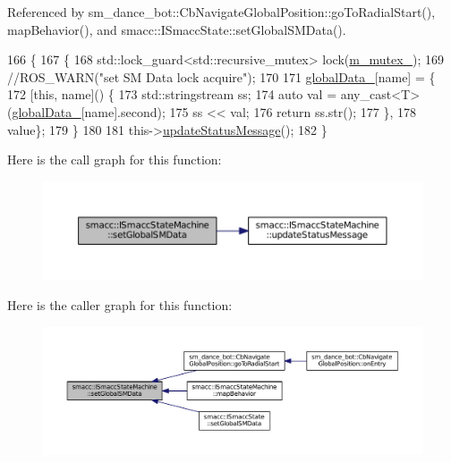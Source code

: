 Referenced by sm\+\_\+dance\+\_\+bot\+::\+Cb\+Navigate\+Global\+Position\+::go\+To\+Radial\+Start(), map\+Behavior(), and smacc\+::\+I\+Smacc\+State\+::set\+Global\+S\+M\+Data().


\begin{DoxyCode}
166 \{
167     \{
168         std::lock\_guard<std::recursive\_mutex> lock(\hyperlink{classsmacc_1_1ISmaccStateMachine_aac785541646e5c517273bf31072505a1}{m\_mutex\_});
169         \textcolor{comment}{//ROS\_WARN("set SM Data lock acquire");}
170 
171         \hyperlink{classsmacc_1_1ISmaccStateMachine_ad2f9dae184ea942db632ac4532a10a91}{globalData\_}[name] = \{
172             [\textcolor{keyword}{this}, name]() \{
173                 std::stringstream ss;
174                 \textcolor{keyword}{auto} val = any\_cast<T>(\hyperlink{classsmacc_1_1ISmaccStateMachine_ad2f9dae184ea942db632ac4532a10a91}{globalData\_}[name].second);
175                 ss << val;
176                 \textcolor{keywordflow}{return} ss.str();
177             \},
178             value\};
179     \}
180 
181     this->\hyperlink{classsmacc_1_1ISmaccStateMachine_ad246a49015fadaeb0b1639d7ab99f7d0}{updateStatusMessage}();
182 \}
\end{DoxyCode}


Here is the call graph for this function\+:
\nopagebreak
\begin{figure}[H]
\begin{center}
\leavevmode
\includegraphics[width=350pt]{classsmacc_1_1ISmaccStateMachine_a8588f9e580fbb95b53e2bd2ca3ff1f98_cgraph}
\end{center}
\end{figure}




Here is the caller graph for this function\+:
\nopagebreak
\begin{figure}[H]
\begin{center}
\leavevmode
\includegraphics[width=350pt]{classsmacc_1_1ISmaccStateMachine_a8588f9e580fbb95b53e2bd2ca3ff1f98_icgraph}
\end{center}
\end{figure}


